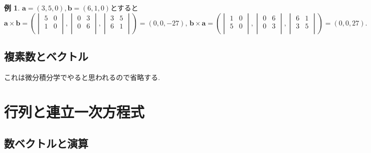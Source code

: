 \documentclass[dvipdfmx,a4paper,11pt]{article}
\theoremstyle{definition}
\newtheorem{exa}[thm]{例}
\begin{document}
 \begin{exa}
 $\bm{a}=(3, 5, 0), \bm{b}=(6, 1, 0)$とすると
 $$
 \bm{a} \times \bm{b}
 =\left(\begin{vmatrix}
5&0\\
1&0 \\
\end{vmatrix},
\begin{vmatrix}
0&3\\
0&6 \\
\end{vmatrix},
\begin{vmatrix}
3&5\\
6&1 \\
\end{vmatrix}
\right)
= (0,0,-27)
\text{, } 
\bm{b} \times  \bm{a} 
 =\left(\begin{vmatrix}
1&0 \\
5&0\\
\end{vmatrix},
\begin{vmatrix}
0&6 \\
0&3\\
\end{vmatrix},
\begin{vmatrix}
6&1 \\
3&5\\
\end{vmatrix}
\right)
= (0,0,27).
 $$
 \end{exa}


\subsection{複素数とベクトル\cite[1.4節]{M}}
これは微分積分学でやると思われるので省略する. 

\newpage
\section{行列と連立一次方程式 \cite[2章]{M}}
\subsection{数ベクトルと演算 \cite[2.1節]{M}}
\label{subsec-2.1}
\end{document}
